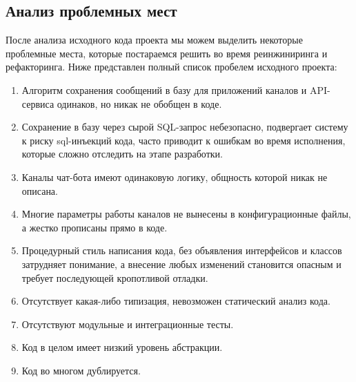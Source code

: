     \subsection{Анализ проблемных мест}
    После анализа исходного кода проекта мы можем выделить некоторые проблемные места, которые постараемся решить во время
    реинжиниринга и рефакторинга. Ниже представлен полный список пробелем исходного проекта:
    \begin{enumerate}
        \item Алгоритм сохранения сообщений в базу для приложений каналов и API-сервиса одинаков, но никак не обобщен в коде.
        \item Сохранение в базу через сырой SQL-запрос небезопасно, подвергает систему к риску sql-инъекций кода, часто приводит
        к ошибкам во время исполнения, которые сложно отследить на этапе разработки.
        \item Каналы чат-бота имеют одинаковую логику, общность которой никак не описана. 
        \item Многие параметры работы каналов не вынесены в конфигурационные файлы, а жестко прописаны прямо в коде.
        \item Процедурный стиль написания кода, без объявления интерфейсов и классов затрудняет понимание,
        а внесение любых изменений становится опасным и требует последующей кропотливой отладки.
        \item Отсутствует какая-либо типизация, невозможен статический анализ кода.
        \item Отсутствуют модульные и интеграционные тесты.
        \item Код в целом имеет низкий уровень абстракции.
        \item Код во многом дублируется.
    \end{enumerate}

